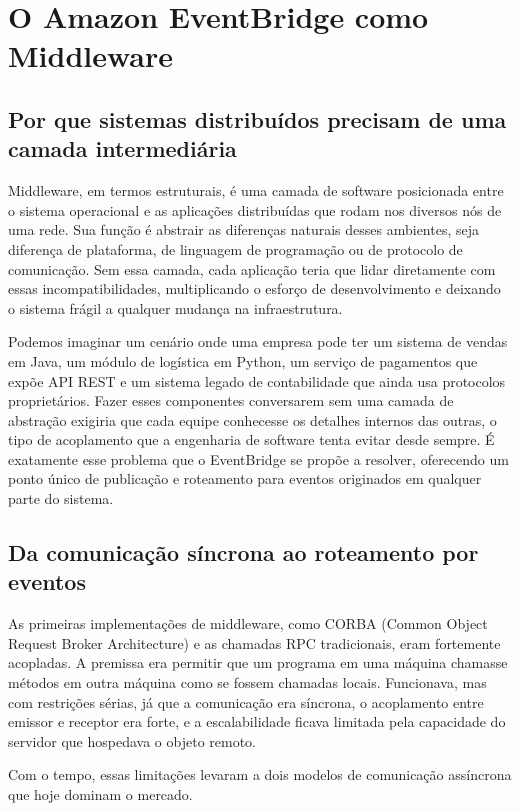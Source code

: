 \documentclass[12pt, a4paper]{article}
\begin{document}
\section{O Amazon EventBridge como Middleware}

\subsection{Por que sistemas distribuídos precisam de uma camada intermediária}

Middleware, em termos estruturais, é uma camada de software posicionada entre o sistema operacional e as aplicações distribuídas que rodam nos diversos nós de uma rede. Sua função é abstrair as diferenças naturais desses ambientes, seja diferença de plataforma, de linguagem de programação ou de protocolo de comunicação. Sem essa camada, cada aplicação teria que lidar diretamente com essas incompatibilidades, multiplicando o esforço de desenvolvimento e deixando o sistema frágil a qualquer mudança na infraestrutura.

Podemos imaginar um cenário onde uma empresa pode ter um sistema de vendas em Java, um módulo de logística em Python, um serviço de pagamentos que expõe API REST e um sistema legado de contabilidade que ainda usa protocolos proprietários. Fazer esses componentes conversarem sem uma camada de abstração exigiria que cada equipe conhecesse os detalhes internos das outras, o tipo de acoplamento que a engenharia de software tenta evitar desde sempre. É exatamente esse problema que o EventBridge se propõe a resolver, oferecendo um ponto único de publicação e roteamento para eventos originados em qualquer parte do sistema.

\subsection{Da comunicação síncrona ao roteamento por eventos}

As primeiras implementações de middleware, como CORBA (Common Object Request Broker Architecture) e as chamadas RPC tradicionais, eram fortemente acopladas. A premissa era permitir que um programa em uma máquina chamasse métodos em outra máquina como se fossem chamadas locais. Funcionava, mas com restrições sérias, já que a comunicação era síncrona, o acoplamento entre emissor e receptor era forte, e a escalabilidade ficava limitada pela capacidade do servidor que hospedava o objeto remoto.

Com o tempo, essas limitações levaram a dois modelos de comunicação assíncrona que hoje dominam o mercado.
\end{document}
